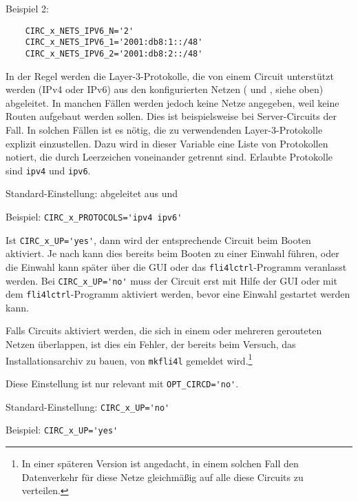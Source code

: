 \begin{description}
Beispiel 2:
\begin{example}
\begin{verbatim}
    CIRC_x_NETS_IPV6_N='2'
    CIRC_x_NETS_IPV6_1='2001:db8:1::/48'
    CIRC_x_NETS_IPV6_2='2001:db8:2::/48'
\end{verbatim}
\end{example}


In der Regel werden die Layer-3-Protokolle, die von einem Circuit unterstützt
werden (IPv4 oder IPv6) aus den konfigurierten Netzen
( und , siehe oben)
abgeleitet. In manchen Fällen werden jedoch keine Netze angegeben, weil keine
Routen aufgebaut werden sollen. Dies ist beispielsweise bei Server-Circuits der
Fall. In solchen Fällen ist es nötig, die zu verwendenden Layer-3-Protokolle
explizit einzustellen. Dazu wird in dieser Variable eine Liste von Protokollen
notiert, die durch Leerzeichen voneinander getrennt sind. Erlaubte Protokolle
sind \texttt{ipv4} und \texttt{ipv6}.

Standard-Einstellung: abgeleitet aus  und

Beispiel: \verb+CIRC_x_PROTOCOLS='ipv4 ipv6'+


Ist \verb+CIRC_x_UP='yes'+, dann wird der entsprechende Circuit beim Booten
aktiviert. Je nach  kann dies bereits beim
Booten zu einer Einwahl führen, oder die Einwahl kann später über die GUI oder
das \texttt{fli4lctrl}-Programm veranlasst werden. Bei \verb+CIRC_x_UP='no'+
muss der Circuit erst mit Hilfe der GUI oder mit dem \texttt{fli4lctrl}-Programm
aktiviert werden, bevor eine Einwahl gestartet werden kann.

Falls Circuits aktiviert werden, die sich in einem oder mehreren gerouteten
Netzen überlappen, ist dies ein Fehler, der bereits beim Versuch, das
Installationsarchiv zu bauen, von \texttt{mkfli4l} gemeldet
wird.\footnote{In einer späteren Version ist angedacht, in einem solchen Fall
den Datenverkehr für diese Netze gleichmäßig auf alle diese Circuits zu
verteilen.}

Diese Einstellung ist nur relevant mit \verb+OPT_CIRCD='no'+.

Standard-Einstellung: \verb+CIRC_x_UP='no'+

Beispiel: \verb+CIRC_x_UP='yes'+


\end{description}
